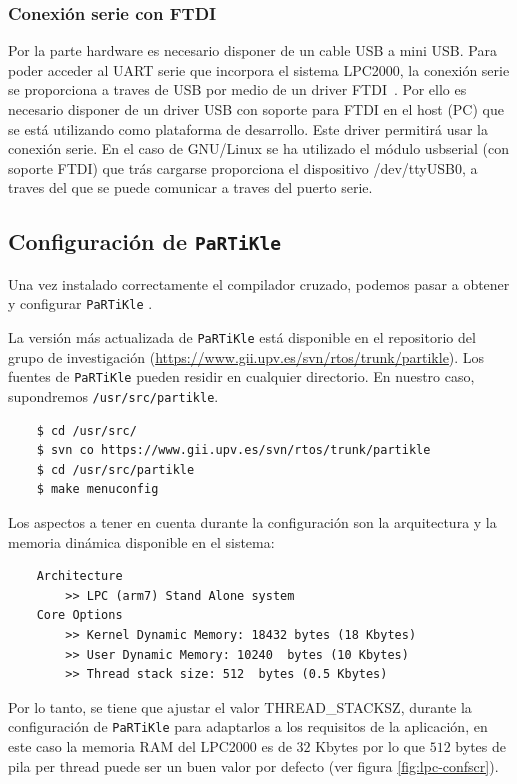 \documentclass[10pt,a4paper]{article}
\newcommand{\partikle}[0]{\texttt{PaRTiKle}}
\newcommand{\hrefx}[1]{\href{#1}{#1}} %
\begin{document}
	\subsubsection{Conexión serie con FTDI}

	Por la parte hardware es necesario disponer de un cable USB a mini USB. Para poder acceder al UART serie que incorpora el sistema LPC2000, la conexión serie se proporciona a traves de USB por medio de un driver FTDI~\cite{FTDI}. Por ello es necesario disponer de un driver USB con soporte para FTDI en el host (PC) que se está utilizando como plataforma de desarrollo. Este driver permitirá usar la conexión serie. En el caso de GNU/Linux se ha utilizado el módulo usbserial (con soporte FTDI) que trás cargarse proporciona el dispositivo /dev/ttyUSB0, a traves del que se puede comunicar a traves del puerto serie.
	
	
	\subsection{Configuración de \partikle{}}
			
	Una vez instalado correctamente el compilador cruzado, podemos pasar a obtener y configurar \partikle{} \cite{partikleos}.
	
	La versión más actualizada de \partikle{} está disponible en el repositorio del grupo de investigación (\hrefx{https://www.gii.upv.es/svn/rtos/trunk/partikle}). Los fuentes de \partikle{} pueden residir en cualquier directorio. En nuestro caso, supondremos \texttt{/usr/\-src/\-partikle}.
	
	\begin{verbatim}
	$ cd /usr/src/
	$ svn co https://www.gii.upv.es/svn/rtos/trunk/partikle
	$ cd /usr/src/partikle
	$ make menuconfig
	\end{verbatim}

	Los aspectos a tener en cuenta durante la configuración son la arquitectura y la memoria dinámica disponible en el sistema:

	\begin{verbatim}
	Architecture 
	    >> LPC (arm7) Stand Alone system
	Core Options 
	    >> Kernel Dynamic Memory: 18432 bytes (18 Kbytes)
	    >> User Dynamic Memory: 10240  bytes (10 Kbytes)
	    >> Thread stack size: 512  bytes (0.5 Kbytes)
	\end{verbatim}

	Por lo tanto, se tiene que ajustar el valor THREAD\_STACKSZ, durante la configuración de \partikle{} para adaptarlos a los requisitos de la aplicación, en este caso la memoria RAM del LPC2000 es de $32$ Kbytes por lo que $512$ bytes de pila per thread puede ser un buen valor por defecto (ver figura \ref{fig:lpc-confscr}).
	
\end{document}
